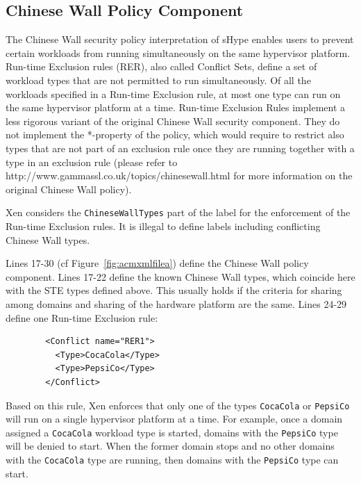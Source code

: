 \documentclass[11pt,twoside,final,openright]{report}
\begin{document}
\subsection{Chinese Wall Policy Component}

The Chinese Wall security policy interpretation of sHype enables users
to prevent certain workloads from running simultaneously on the same
hypervisor platform.  Run-time Exclusion rules (RER), also called
Conflict Sets, define a set of workload types that are not permitted
to run simultaneously. Of all the workloads specified in a Run-time
Exclusion rule, at most one type can run on the same hypervisor
platform at a time.  Run-time Exclusion Rules implement a less
rigorous variant of the original Chinese Wall security component. They
do not implement the *-property of the policy, which would require to
restrict also types that are not part of an exclusion rule once they
are running together with a type in an exclusion rule (please refer to
http://www.gammassl.co.uk/topics/chinesewall.html for more information
on the original Chinese Wall policy).

Xen considers the \verb|ChineseWallTypes| part of the label for the
enforcement of the Run-time Exclusion rules.  It is illegal to define
labels including conflicting Chinese Wall types.

Lines 17-30 (cf Figure~\ref{fig:acmxmlfilea}) define the Chinese Wall
policy component. Lines 17-22 define the known Chinese Wall types,
which coincide here with the STE types defined above. This usually
holds if the criteria for sharing among domains and sharing of the
hardware platform are the same. Lines 24-29 define one Run-time
Exclusion rule:

\begin{scriptsize}
\begin{verbatim}
        <Conflict name="RER1">
          <Type>CocaCola</Type>
          <Type>PepsiCo</Type>
        </Conflict>
\end{verbatim}
\end{scriptsize}

Based on this rule, Xen enforces that only one of the types
\verb|CocaCola| or \verb|PepsiCo| will run on a single hypervisor
platform at a time. For example, once a domain assigned a
\verb|CocaCola| workload type is started, domains with the
\verb|PepsiCo| type will be denied to start. When the former domain
stops and no other domains with the \verb|CocaCola| type are running,
then domains with the \verb|PepsiCo| type can start.
\end{document}

